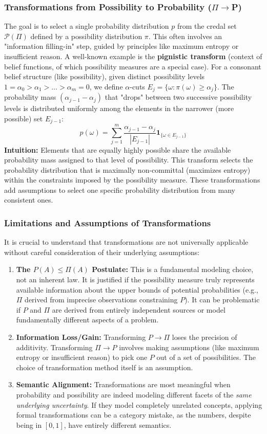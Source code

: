\subsubsection{Transformations from Possibility to Probability ($\Pi\to$P)}
The goal is to select a single probability distribution $p$ from the credal set $\mathcal{P}(\Pi)$ defined by a possibility distribution $\pi$. This often involves an "information filling-in" step, guided by principles like maximum entropy or insufficient reason.
A well-known example is the \textbf{pignistic transform} (context of belief functions, of which possibility measures are a special case). For a consonant belief structure (like possibility), given distinct possibility levels $1 = \alpha_0 > \alpha_1 > \dots > \alpha_m = 0$, we define $\alpha$-cuts $E_j = \{\omega : \pi(\omega) \ge \alpha_j\}$. The probability mass $(\alpha_{j-1} - \alpha_j)$ that "drops" between two successive possibility levels is distributed uniformly among the elements in the narrower (more possible) set $E_{j-1}$:
\[ p(\omega) = \sum_{j=1}^{m} \frac{\alpha_{j-1} - \alpha_j}{|E_{j-1}|} \mathbf{1}_{\{\omega \in E_{j-1}\}} \]
\textbf{Intuition:} Elements that are equally highly possible share the available probability mass assigned to that level of possibility. This transform selects the probability distribution that is maximally non-committal (maximizes entropy) within the constraints imposed by the possibility measure. These transformations add assumptions to select one specific probability distribution from many consistent ones.

\subsubsection{Limitations and Assumptions of Transformations}
It is crucial to understand that transformations are not universally applicable without careful consideration of their underlying assumptions:
\begin{enumerate}
    \item \textbf{The $P(A) \le \Pi(A)$ Postulate:} This is a fundamental modeling choice, not an inherent law. It is justified if the possibility measure truly represents available information about the upper bounds of potential probabilities (e.g., $\Pi$ derived from imprecise observations constraining $P$). It can be problematic if $P$ and $\Pi$ are derived from entirely independent sources or model fundamentally different aspects of a problem.
    \item \textbf{Information Loss/Gain:} Transforming $P \to \Pi$ loses the precision of additivity. Transforming $\Pi \to P$ involves making assumptions (like maximum entropy or insufficient reason) to pick one $P$ out of a set of possibilities. The choice of transformation method itself is an assumption.
    \item \textbf{Semantic Alignment:} Transformations are most meaningful when probability and possibility are indeed modeling different facets of the \textit{same underlying uncertainty}. If they model completely unrelated concepts, applying formal transformations can be a category mistake, as the numbers, despite being in $[0, 1]$, have entirely different semantics.
\end{enumerate}